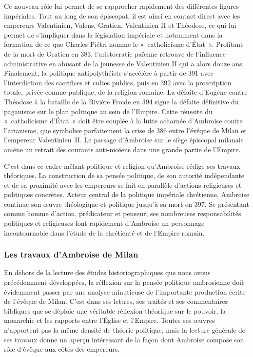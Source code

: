 Ce nouveau rôle lui permet de se rapprocher rapidement des différentes figures impériales. Tout au long de son épiscopat, il est ainsi en contact direct avec les empereurs Valentinien, Valens, Gratien, Valentinien II et Théodose, ce qui lui permet de s’impliquer dans la législation impériale et notamment dans la formation de ce que Charles Piétri nomme le «~catholicisme d’État~»\autocite[401]{pietri_paganisme_1995}. Profitant de la mort de Gratien en 383, l’aristocratie païenne retrouve de l’influence administrative en abusant de la jeunesse de Valentinien II qui a alors douze ans. Finalement, la politique antipolythéiste s’accélère à partir de 391 avec l’interdiction des sacrifices et cultes publics, puis en 392 avec la proscription totale, privée comme publique, de la religion romaine. La défaite d’Eugène contre Théodose à la bataille de la Rivière Froide en 394 signe la défaite définitive du paganisme sur le plan politique au sein de l’Empire. Cette réussite du «~catholicisme d’État~» doit être couplée à la lutte acharnée d’Ambroise contre l’arianisme, que symbolise parfaitement la crise de 386 entre l’évêque de Milan et l'empereur Valentinien~II\autocite{nauroy_crise_2009}. Le passage d’Ambroise sur le siège épiscopal milanais amène un retrait des courants anti-nicéens dans une grande partie de l’Empire.

\bigskip

C'est dans ce cadre mêlant politique et religion qu'Ambroise rédige ses travaux théoriques. La construction de sa pensée politique, de son autorité indépendante et de sa proximité avec les empereurs se fait en parallèle d'actions religieuses et politiques concrètes. Acteur central de la politique impériale chrétienne, Ambroise continue son œuvre théologique et politique jusqu’à sa mort en 397. Se présentant comme homme d’action, prédicateur et penseur, ses nombreuses responsabilités politiques et religieuses font rapidement d’Ambroise un personnage incontour\-nable dans l’étude de la chrétienté et de l’Empire romain.

\bigskip

\subsubsection*{Les travaux d'Ambroise de Milan}

En dehors de la lecture des études historiographiques que nous avons précédemment développées, la réflexion sur la pensée politique ambrosienne doit évidemment passer par une analyse minutieuse de l'importante production écrite de l'évêque de Milan. C’est dans ses lettres, ses traités et ses commentaires bibliques que se déploie une véritable réflexion théorique sur le pouvoir, la monarchie et les rapports entre l’Église et l’Empire. Toutes ses œuvres n'apportent pas la même densité de théorie politique, mais la lecture générale de ses travaux donne un aperçu intéressant de la façon dont Ambroise compose son rôle d'évêque aux côtés des empereurs.

